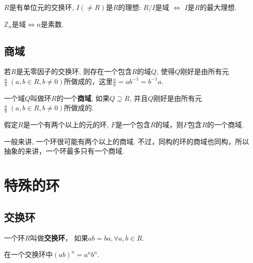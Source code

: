 \begin{Theorem}[!]
$R$是有单位元的交换环, $I (\neq R)$是$R$的理想: $R/I$是域 $\Leftrightarrow$
$I$是$R$的最大理想.
\end{Theorem}

\begin{Proposition}
$\mathbb{Z}_n$是域$\Leftrightarrow n$是素数. 
\end{Proposition}

\subsection{商域}

\begin{Theorem}
若$R$是无零因子的交换环, 则存在一个包含$R$的域$Q$, 使得$Q$刚好是由所有元$\displaystyle \frac{a}{b} \; (a, b \in R, b \neq \mathfrak{0} )$所做成的，这里$\displaystyle \frac{a}{b} = ab^{-1} = b^{-1}a$.
\end{Theorem}

\begin{Definition}[商域]
一个域$Q$叫做环$R$的一个\textbf{商域}, 如果$Q \supseteq R$, 并且$Q$刚好是由所有元$\displaystyle \frac{a}{b} \; (a, b \in R, b \neq 0)$所做成的.
\end{Definition}

\begin{Theorem}
假定$R$是一个有两个以上的元的环, $F$是一个包含$R$的域，则$F$包含$R$的一个商域.
\end{Theorem}

\begin{Note}
一般来讲, 一个环很可能有两个以上的商域. 不过，同构的环的商域也同构，所以抽象的来讲，一个环最多只有一个商域.
\end{Note}

\section{特殊的环}

\subsection{交换环}

\begin{Definition}[交换环]
一个环$R$叫做\textbf{交换环}， 如果$ab = ba,  \forall a, b \in R$.
\end{Definition}

\begin{Proposition}
在一个交换环中${(ab)}^n = a^n b^n$.
\end{Proposition}

